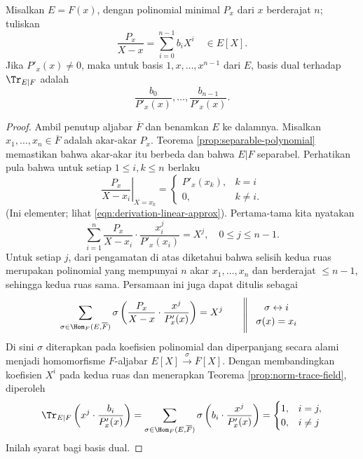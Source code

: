 \begin{theorem}
	Misalkan $E=F(x)$, dengan polinomial minimal $P_x$ dari $x$ berderajat $n$; tuliskan
	\[ \frac{P_x}{X-x} = \sum_{i=0}^{n-1} b_i X^i \quad \in E[X]. \]
	Jika $P'_x(x) \neq 0$, maka untuk basis $1, x, \ldots, x^{n-1}$ dari $E$, basis dual terhadap $\Tr_{E|F}$ adalah
	\[ \frac{b_0}{P'_x(x)}, \ldots, \frac{b_{n-1}}{P'_x(x)}. \]
\end{theorem}
\begin{proof}
	Ambil penutup aljabar $\overline{F}$ dan benamkan $E$ ke dalamnya. Misalkan $x_1, \ldots, x_n \in \overline{F}$ adalah akar-akar $P_x$. Teorema \ref{prop:separable-polynomial} memastikan bahwa akar-akar itu berbeda dan bahwa $E|F$ separabel. Perhatikan pula bahwa untuk setiap $1 \leq i,k \leq n$ berlaku
	\[ \left. \frac{P_x}{X - x_i} \right|_{X=x_k} = \begin{cases}
		P'_x(x_k), & k =i \\
		0, & k \neq i.
	\end{cases}\]
	(Ini elementer; lihat \eqref{eqn:derivation-linear-approx}). Pertama-tama kita nyatakan
	\[ \sum_{i=1}^n \frac{P_x}{X-x_i} \cdot \frac{x_i^j}{P'_x(x_i)} = X^j, \quad 0 \leq j \leq n-1. \]
	Untuk setiap $j$, dari pengamatan di atas diketahui bahwa selisih kedua ruas merupakan polinomial yang mempunyai $n$ akar $x_1, \ldots, x_n$ dan berderajat $\leq n-1$, sehingga kedua ruas sama. Persamaan ini juga dapat ditulis sebagai
	\[ \sum_{\sigma \in \Hom_F(E,\overline{F})} \sigma \left( \frac{P_x}{X-x} \cdot \frac{x^j}{P'_x(x)} \right) = X^j \qquad
	\begin{tikzpicture}[baseline]
			\matrix[matrix of math nodes, left delimiter={\|}]
				{\sigma \leftrightarrow i \\ \sigma(x)=x_i \\ };
	\end{tikzpicture} \]
	Di sini $\sigma$ diterapkan pada koefisien polinomial dan diperpanjang secara alami menjadi homomorfisme $F$-aljabar $E[X] \xrightarrow{\sigma} \overline{F}[X]$. Dengan membandingkan koefisien $X^i$ pada kedua ruas dan menerapkan Teorema \ref{prop:norm-trace-field}, diperoleh
	\[ \Tr_{E|F}\left(  x^j \cdot \frac{b_i}{P'_x(x)}\right)=\sum_{\sigma \in \Hom_F(E,\overline{F})} \sigma \left( b_i \cdot \frac{x^j}{P'_x(x)} \right)  = \begin{cases} 1, & i=j, \\ 0, & i \neq j \end{cases} \]
	Inilah syarat bagi basis dual.
\end{proof}

